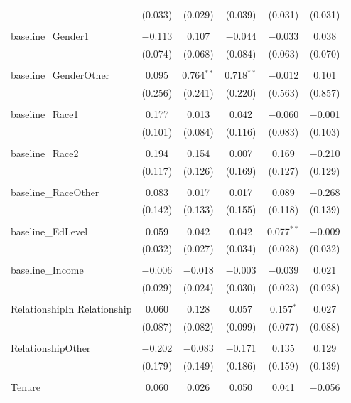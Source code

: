 \begin{table}[!htbp]
\begin{tabular}{@{\extracolsep{5pt}}lccccc}
  & (0.033) & (0.029) & (0.039) & (0.031) & (0.031) \\ 
  & & & & & \\ 
 baseline\_Gender1 & $-$0.113 & 0.107 & $-$0.044 & $-$0.033 & 0.038 \\ 
  & (0.074) & (0.068) & (0.084) & (0.063) & (0.070) \\ 
  & & & & & \\ 
 baseline\_GenderOther & 0.095 & 0.764$^{**}$ & 0.718$^{**}$ & $-$0.012 & 0.101 \\ 
  & (0.256) & (0.241) & (0.220) & (0.563) & (0.857) \\ 
  & & & & & \\ 
 baseline\_Race1 & 0.177 & 0.013 & 0.042 & $-$0.060 & $-$0.001 \\ 
  & (0.101) & (0.084) & (0.116) & (0.083) & (0.103) \\ 
  & & & & & \\ 
 baseline\_Race2 & 0.194 & 0.154 & 0.007 & 0.169 & $-$0.210 \\ 
  & (0.117) & (0.126) & (0.169) & (0.127) & (0.129) \\ 
  & & & & & \\ 
 baseline\_RaceOther & 0.083 & 0.017 & 0.017 & 0.089 & $-$0.268 \\ 
  & (0.142) & (0.133) & (0.155) & (0.118) & (0.139) \\ 
  & & & & & \\ 
 baseline\_EdLevel & 0.059 & 0.042 & 0.042 & 0.077$^{**}$ & $-$0.009 \\ 
  & (0.032) & (0.027) & (0.034) & (0.028) & (0.032) \\ 
  & & & & & \\ 
 baseline\_Income & $-$0.006 & $-$0.018 & $-$0.003 & $-$0.039 & 0.021 \\ 
  & (0.029) & (0.024) & (0.030) & (0.023) & (0.028) \\ 
  & & & & & \\ 
 RelationshipIn Relationship & 0.060 & 0.128 & 0.057 & 0.157$^{*}$ & 0.027 \\ 
  & (0.087) & (0.082) & (0.099) & (0.077) & (0.088) \\ 
  & & & & & \\ 
 RelationshipOther & $-$0.202 & $-$0.083 & $-$0.171 & 0.135 & 0.129 \\ 
  & (0.179) & (0.149) & (0.186) & (0.159) & (0.139) \\ 
  & & & & & \\ 
 Tenure & 0.060 & 0.026 & 0.050 & 0.041 & $-$0.056 \\ 

\end{tabular}
\end{table}

